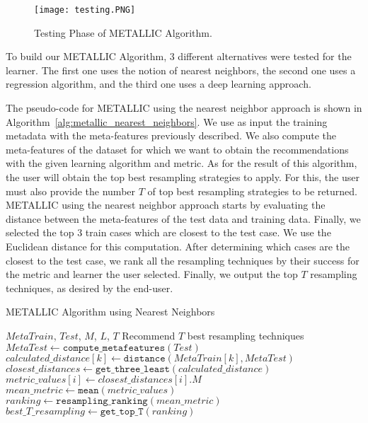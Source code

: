 \documentclass{article}
\begin{document}
\begin{figure}[!ht]
\texttt{[image: testing.PNG]}
\centering
\caption{Testing Phase of METALLIC Algorithm.}\label{Testing}
\end{figure}

To build our METALLIC Algorithm, 3 different alternatives were tested for the learner. The first one uses the notion of nearest neighbors, the second one uses a regression algorithm, and the third one uses a deep learning approach. 

The pseudo-code for METALLIC using the nearest neighbor approach is shown in Algorithm~\autoref{alg:metallic_nearest_neighbors}. We use as input the training metadata with the meta-features previously described. We also compute the meta-features of the dataset for which we want to obtain the recommendations with the given learning algorithm and metric. As for the result of this algorithm, the user will obtain the top best resampling strategies to apply. For this, the user must also provide the number $T$ of top best resampling strategies to be returned. METALLIC using the nearest neighbor approach starts by evaluating the distance between the meta-features of the test data and training data. Finally, we selected the top 3 train cases which are closest to the test case. We use the Euclidean distance for this computation. After determining which cases are the closest to the test case, we rank all the resampling techniques by their success for the metric and learner the user selected. Finally, we output the top $T$ resampling techniques, as desired by the end-user. 



\begin{algorithm}[!ht]
    \caption{METALLIC Algorithm using Nearest Neighbors}\label{alg:metallic_nearest_neighbors}
\begin{algorithmic}[1]
\Require$MetaTrain$, $Test$, $M$, $L$, $T$
\Ensure{}Recommend $T$ best resampling techniques
\State$MetaTest\gets\texttt{compute\_metafeatures}(Test)$
    \State$calculated\_distance[k]\gets\texttt{distance}(MetaTrain[k],MetaTest)$
    \EndFor{}
\State$closest\_distances\gets\texttt{get\_three\_least}(calculated\_distance)$
    \State$metric\_values[i]\gets closest\_distances[i].M$
    \EndFor{}
\State$mean\_metric\gets\texttt{mean}(metric\_values)$
\State$ranking\gets\texttt{resampling\_ranking}(mean\_metric)$
\State$best\_T\_resampling\gets\texttt{get\_top\_T}(ranking)$
\end{algorithmic}
\end{algorithm}
\end{document}
